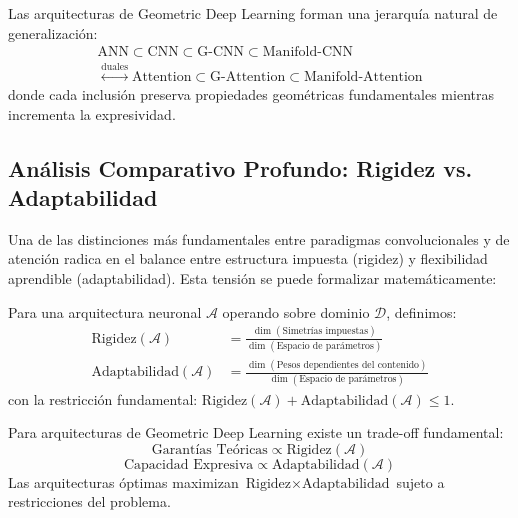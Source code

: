 \begin{remark}\label{rem:jerarquia_generalizacion}
Las arquitecturas de Geometric Deep Learning forman una jerarquía natural de generalización:
\begin{multline}
\text{ANN} \subset \text{CNN} \subset \text{G-CNN} \subset \text{Manifold-CNN} \\
\stackrel{\text{duales}}{\leftrightarrow} \text{Attention} \subset \text{G-Attention} \subset \text{Manifold-Attention}
\end{multline}
donde cada inclusión preserva propiedades geométricas fundamentales mientras incrementa la expresividad.
\end{remark}

\subsection{Análisis Comparativo Profundo: Rigidez vs. Adaptabilidad}\label{subsec:rigidez_adaptabilidad}

Una de las distinciones más fundamentales entre paradigmas convolucionales y de atención radica en el balance entre estructura impuesta (rigidez) y flexibilidad aprendible (adaptabilidad). Esta tensión se puede formalizar matemáticamente:

\begin{definition}\label{def:espectro_rigidez_adaptabilidad}
Para una arquitectura neuronal $\mathcal{A}$ operando sobre dominio $\mathcal{D}$, definimos:
\begin{align}
    \text{Rigidez}(\mathcal{A}) &= \frac{\dim(\text{Simetrías impuestas})}{\dim(\text{Espacio de parámetros})} \\
    \text{Adaptabilidad}(\mathcal{A}) &= \frac{\dim(\text{Pesos dependientes del contenido})}{\dim(\text{Espacio de parámetros})}
\end{align}
con la restricción fundamental: $\text{Rigidez}(\mathcal{A}) + \text{Adaptabilidad}(\mathcal{A}) \leq 1$.
\end{definition}

\begin{remark}\label{rem:tradeoff_rigidez_adaptabilidad}
Para arquitecturas de Geometric Deep Learning existe un trade-off fundamental:
\begin{equation}
    \text{Garantías Teóricas} \propto \text{Rigidez}(\mathcal{A})
\end{equation}
\begin{equation}
    \text{Capacidad Expresiva} \propto \text{Adaptabilidad}(\mathcal{A})
\end{equation}
Las arquitecturas óptimas maximizan $\text{Rigidez} \times \text{Adaptabilidad}$ sujeto a restricciones del problema.
\end{remark}

